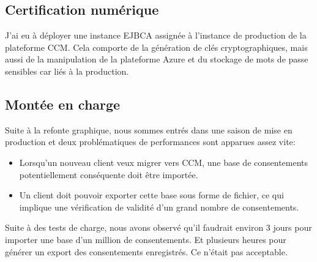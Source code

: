 \documentclass[12pt, a4paper]{report}
\newcommand\tab[1][1cm]{\hspace*{#1}}
\begin{document}
        \subsection{Certification numérique}
            J'ai eu à déployer une instance EJBCA assignée à l'instance de production de la plateforme CCM.\newline
            Cela comporte de la génération de clés cryptographiques, mais aussi de la manipulation de la plateforme Azure et du stockage de mots de passe sensibles car liés à la production.
        \subsection{Montée en charge}
            \tab{} Suite à la refonte graphique, nous sommes entrés dans une saison de mise en production et deux problématiques de performances sont apparues assez vite:
            \begin{itemize}
            \item Lorsqu'un nouveau client veux migrer vers CCM, une base de consentements potentiellement conséquente doit être importée.
            \item Un client doit pouvoir exporter cette base sous forme de fichier, ce qui implique une vérification de validité d'un grand nombre de consentements.
            \end{itemize}

            Suite à des tests de charge, nous avons observé qu'il faudrait environ 3 jours pour importer une base d'un million de consentements. Et plusieurs heures pour générer un export des consentements enregistrés. Ce n'était pas acceptable.\newpage
\end{document}
